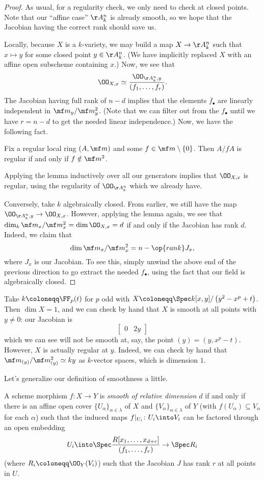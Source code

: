 \documentclass[../notes.tex]{subfiles}
\begin{document}
\begin{proof}
	As usual, for a regularity check, we only need to check at closed points. Note that our ``affine case'' $\AA^n_k$ is already smooth, so we hope that the Jacobian having the correct rank should save us.

	Locally, because $X$ is a $k$-variety, we may build a map $X\to\AA^n_k$ such that $x\mapsto y$ for some closed point $y\in\AA^n_k$. (We have implicitly replaced $X$ with an affine open subscheme containing $x$.) Now, we see that
	\[\OO_{X,x}\simeq\frac{\OO_{\AA^n_k,y}}{(f_1,\ldots,f_r)}.\]
	The Jacobian having full rank of $n-d$ implies that the elements $\overline f_\bullet$ are linearly independent in $\mf m_y/\mf m_y^2$. (Note that we can filter out from the $f_\bullet$ until we have $r=n-d$ to get the needed linear independence.) Now, we have the following fact.
	\begin{lemma}
		Fix a regular local ring $(A,\mf m)$ and some $f\in\mf m\setminus\{0\}$. Then $A/fA$ is regular if and only if $f\notin\mf m^2$.
	\end{lemma}
	Applying the lemma inductively over all our generators implies that $\OO_{X,x}$ is regular, using the regularity of $\OO_{\AA^n_k}$ which we already have.

	Conversely, take $k$ algebraically closed. From earlier, we still have the map $\OO_{\AA^n_k,y}\to\OO_{X,x}$. However, applying the lemma again, we see that $\dim_k\mf m_x/\mf m_x^2=\dim\OO_{X,x}=d$ if and only if the Jacobian has rank $d$. Indeed, we claim that
	\[\dim\mf m_x/\mf m_x^2=n-\op{rank}J_x,\]
	where $J_x$ is our Jacobian. To see this, simply unwind the above end of the previous direction to go extract the needed $f_\bullet$, using the fact that our field is algebraically closed.
\end{proof}
\begin{nex}
	Take $k\coloneqq\FF_p(t)$ for $p$ odd with $X\coloneqq\Spec k[x,y]/\left(y^2-x^p+t\right)$. Then $\dim X=1$, and we can check by hand that $X$ is smooth at all points with $y\ne0$: our Jacobian is
	\[\begin{bmatrix}
		0 & 2y
	\end{bmatrix}\]
	which we can see will not be smooth at, say, the point $(y)=\left(y,x^p-t\right)$. However, $X$ is actually regular at $y$. Indeed, we can check by hand that $\mf m_{(y)}/\mf m_{(y)}^2\simeq ky$ as $k$-vector spaces, which is dimension $1$.
\end{nex}
Let's generalize our definition of smoothness a little.
\begin{definition}[Smooth]
	A scheme morphism $f\colon X\to Y$ is \textit{smooth of relative dimension $d$} if and only if there is an affine open cover $\{U_\alpha\}_{\alpha\in\lambda}$ of $X$ and $\{V_\alpha\}_{\alpha\in\lambda}$ of $Y$ (with $f(U_\alpha)\subseteq V_\alpha$ for each $\alpha$) such that the induced maps $f|_{U_i}\colon U_i\into V_i$ can be factored through an open embedding
	\[U_i\into\Spec\frac{R[x_1,\ldots,x_{d+r}]}{(f_1,\ldots,f_r)}\to\Spec R_i\]
	(where $R_i\coloneqq\OO_Y(V_i)$) such that the Jacobian $J$ has rank $r$ at all points in $U$.
\end{definition}
\end{document}
